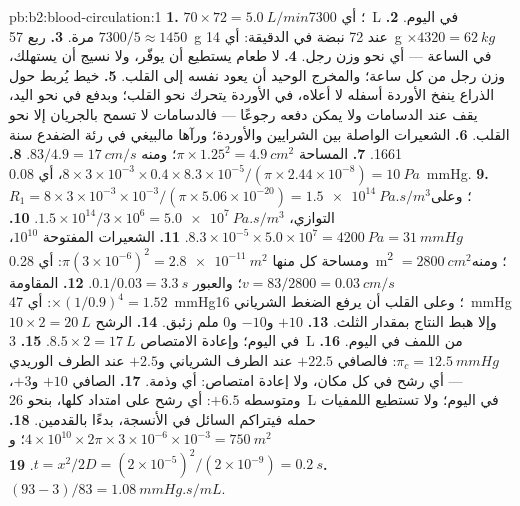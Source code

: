 \begin{solution}{pb:b2:blood-circulation:1}
\textbf{1.} $70\times 72 = \qty{5.0}{L/min}$؛ أي \qty{7300}{L} في اليوم.
\textbf{2.} $7300/5 \approx 1450$ مرة.
\textbf{3.} ربع \qty{57}{g} عند 72 نبضة في الدقيقة: أي \qty{14}{g}
$\times 4320 = \qty{62}{kg}$ في الساعة --- أي نحو وزن رجل.
\textbf{4.} لا طعام يستطيع أن يوفّر، ولا نسيج أن يستهلك، وزن رجل
من  كل ساعة؛ والمخرج الوحيد أن يعود  نفسه
إلى القلب.
\textbf{5.} خيط يُربط حول الذراع ينفخ الأوردة أسفله لا
أعلاه،  في الأوردة يتحرك نحو القلب؛ وبدفع
 في  نحو اليد، يقف عند الدسامات ولا يمكن
دفعه رجوعًا --- فالدسامات لا تسمح بالجريان إلا نحو القلب.
\textbf{6.} الشعيرات الواصلة بين الشرايين والأوردة؛ ورآها مالبيغي
في رئة الضفدع سنة 1661.
\textbf{7.} المساحة $\pi\times 1.25^{2} = \qty{4.9}{cm^2}$؛ ومنه $83/4.9 =
\qty{17}{cm/s}$.
\textbf{8.} $8\times 3\times 10^{-3}\times 0.4\times 8.3\times
10^{-5}/(\pi\times 2.44\times 10^{-8}) = \qty{10}{Pa}$، أي \qty{0.08}{mmHg}.
\textbf{9.} $R_{1} = 8\times 3\times 10^{-3}\times 10^{-3}/(\pi\times
5.06\times 10^{-20}) = \qty{1.5e14}{Pa.s/m^3}$؛ وعلى التوازي،
$1.5\times 10^{14}/3\times 10^{6} = \qty{5.0e7}{Pa.s/m^3}$.
\textbf{10.} $8.3\times 10^{-5}\times 5.0\times 10^{7} = \qty{4200}{Pa}
= \qty{31}{mmHg}$.
\textbf{11.} الشعيرات المفتوحة $10^{10}$، ومساحة كل منها $\pi(3\times 10^{-6})^{2}
= \qty{2.8e-11}{m^2}$: أي \qty{0.28}{m^2} $= \qty{2800}{cm^2}$؛ ومنه $v =
83/2800 = \qty{0.03}{cm/s}$؛ والعبور $0.1/0.03 = \qty{3.3}{s}$.
\textbf{12.} المقاومة $\times(1/0.9)^{4} = 1.52$: أي \qty{47}{mmHg}؛ وعلى
القلب أن يرفع الضغط الشرياني \qty{16}{mmHg} وإلا هبط
النتاج بمقدار الثلث.
\textbf{13.} $+10$ و$-10$ و$0$ ملم زئبق.
\textbf{14.} الرشح $10\times 2 = \qty{20}{L}$ في اليوم؛ وإعادة الامتصاص
$8.5\times 2 = \qty{17}{L}$.
\textbf{15.} \qty{3}{L} من اللمف في اليوم.
\textbf{16.} $\pi_c = \qty{12.5}{mmHg}$: فالصافي $+22.5$ عند الطرف
الشرياني و$+2.5$ عند الطرف الوريدي --- أي رشح في كل مكان، ولا
إعادة امتصاص: أي وذمة.
\textbf{17.} الصافي $+10$ و$+3$، ومتوسطه $+6.5$: أي رشح على
امتداد  كلها، بنحو \qty{26}{L} في اليوم؛ ولا تستطيع اللمفيات حمله
فيتراكم السائل في الأنسجة، بدءًا بالقدمين.
\textbf{18.} $4\times 10^{10}\times 2\pi\times 3\times 10^{-6}\times
10^{-3} = \qty{750}{m^2}$؛ و$t = x^{2}/2D = (2\times 10^{-5})^{2}/
(2\times 10^{-9}) = \qty{0.2}{s}$.
\textbf{19.} $(93 - 3)/83 = \qty{1.08}{mmHg.s/mL}$.

\end{solution}
